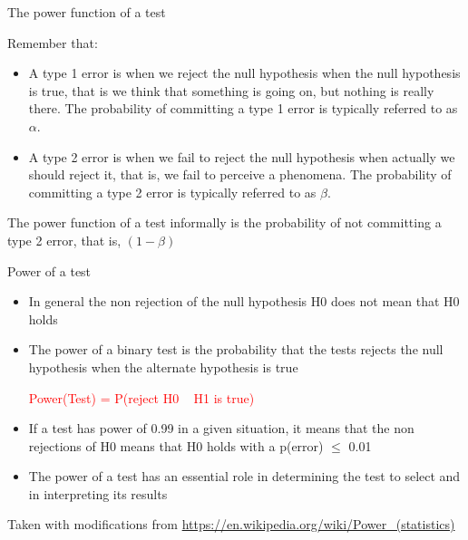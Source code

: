 \documentclass{beamer}
\begin{document}
\begin{frame}
{\centerline{The power function of a test}}
Remember that:
\begin{itemize}
\item A type 1 error is when we reject the null hypothesis when the null hypothesis is true, that is we think that something is going on, but nothing is really there. The probability of committing a type 1 error is typically referred to as $\alpha$.
\item A type 2 error is when we fail to reject the null hypothesis when actually we should reject it, that is, we fail to perceive a phenomena. The probability of committing a type 2 error is typically referred to as $\beta$.
\end{itemize}

The power function of a test informally is the probability of not committing a type 2 error, that is, $(1-\beta)$

\end{frame}


\begin{frame}
{\centerline{Power of a test}}

\begin{itemize}
    \item In general the non rejection of the null hypothesis H0 does not mean that H0 holds
    \item The power of a binary test is the probability that the tests rejects the null hypothesis when the alternate hypothesis is true\\
    \begin{center}
    \textcolor{red}{Power(Test) = P(reject H0 \textbar~ H1 is true)}
    \end{center}
    \item If a test has power of 0.99 in a given situation, it means that the non rejections of H0 means that H0 holds with a p(error) $\leq$ 0.01
    \item The power of a test has an essential role in determining the test to select and in interpreting its results
\end{itemize}

\begin{center}
\tiny{Taken with modifications from \url{https://en.wikipedia.org/wiki/Power_(statistics)}}
\end{center}

\end{frame}
\end{document}
